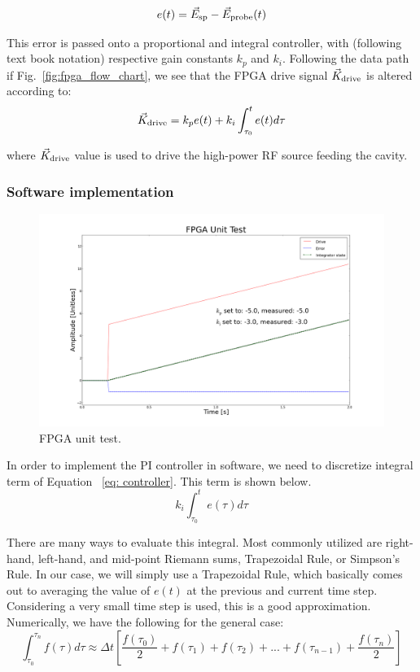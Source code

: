 \documentclass[a4paper,12pt]{article}
\newcommand{\be}{\begin{equation}}
\newcommand{\ee}{\end{equation}}
\begin{document}
\be
e(t) = \vec{E}_{\rm sp} - \vec{E}_{\rm probe}(t)
\ee

\noindent This error is passed onto a proportional and integral controller, with (following text book notation) respective gain constants $k_{p}$ and $k_{i}$. Following the data path if Fig.~\ref{fig:fpga_flow_chart}, we see that the FPGA drive signal $\vec{K}_{\rm drive}$ is altered according to:
\be \label{eq: controller}
\vec{K}_{\rm drive} = k_{p} e(t) + k_{i} \int_{\tau_{0}}^{t} e(t) d\tau
\ee

\noindent where $\vec{K}_{\rm drive}$ value is used to drive the high-power RF source feeding the cavity.

\subsubsection{Software implementation}

\begin{figure}
\centering
\includegraphics[scale=0.25]{../figures/fpga_unit_test.png}
\caption{FPGA unit test.}
\label{fig:fpga_unit_test}
\end{figure}

In order to implement the PI controller in software, we need to discretize integral term of Equation ~\ref{eq: controller}. This term is shown below.
\be
k_{i} \int_{\tau_{0}}^{t} e(\tau)d\tau
\ee

There are many ways to evaluate this integral. Most commonly utilized are right-hand, left-hand, and mid-point Riemann sums, Trapezoidal Rule, or Simpson's Rule. In our case, we will simply use a Trapezoidal Rule, which basically comes out to averaging the value of $e(t)$ at the previous and current time step. Considering a very small time step is used, this is a good approximation. Numerically, we have the following for the general case:
\be
\int_{\tau_{0}}^{\tau_{n}} f(\tau) d\tau \approx \Delta t
		    \left[\frac{f(\tau_{0})}{2} + f(\tau_{1}) + f(\tau_{2}) + ...
		      + f(\tau_{n-1}) + \frac{f(\tau_{n})}{2}\right]
\ee
\end{document}
